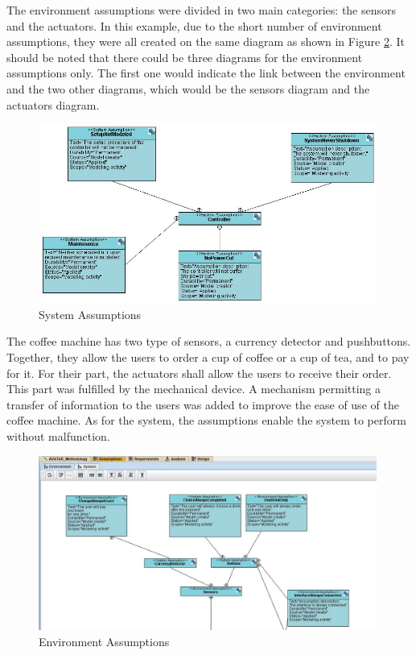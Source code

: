 \documentclass[12pt]{article}
\begin{document}
The environment assumptions were divided in two main categories: the sensors and the actuators. In this example, due to the short number of environment assumptions, they were all created on the same diagram as shown in Figure \ref{fig:envassumptions}. It should be noted that there could be three diagrams for the environment assumptions only. The first one would indicate the link between the environment and the two other diagrams, which would be the sensors diagram and the actuators diagram.
\begin{figure}[htbp]
\centering
\includegraphics[width=0.99\textwidth]{fig/systemassumptions.jpg}
\caption{System Assumptions} \label{fig:systemassumptions}
\end{figure}

The coffee machine has two type of sensors, a currency detector and pushbuttons. Together, they allow the users to order a cup of coffee or a cup of tea, and to pay for it. For their part, the actuators shall allow the users to receive their order. This part was fulfilled by the mechanical device. A mechanism permitting a transfer of information to the users was added to improve the ease of use of the coffee machine. As for the system, the assumptions enable the system to perform without malfunction.

\begin{figure}[htbp]
\centering
\includegraphics[width=0.99\textwidth]{fig/environmentassumptions.jpg}
\caption{Environment Assumptions} \label{fig:envassumptions}
\end{figure}
\end{document}
